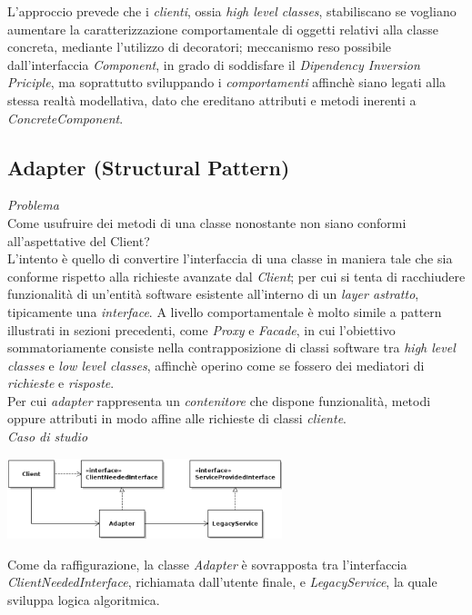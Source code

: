 \documentclass{article}
\begin{document}
L'approccio prevede che i \textit{clienti}, ossia \textit{high level classes}, stabiliscano se vogliano aumentare la caratterizzazione comportamentale di oggetti relativi alla classe concreta, mediante l'utilizzo di decoratori; meccanismo reso possibile  dall'interfaccia \textit{Component}, in grado di soddisfare il \textit{Dipendency Inversion Priciple}, ma soprattutto sviluppando i \textit{comportamenti} affinchè siano legati alla stessa realtà modellativa, dato che ereditano attributi e metodi inerenti a \textit{ConcreteComponent}.

\subsection*{Adapter (Structural Pattern)}
\large
\textit{Problema}\\
Come usufruire dei metodi di una classe nonostante non siano conformi all'aspettative del Client?\vspace*{14pt}\\
L'intento è quello di convertire l'interfaccia di una classe in maniera tale che sia conforme rispetto alla richieste avanzate dal \textit{Client}; per cui si tenta di racchiudere funzionalità di un'entità software esistente all'interno di un \textit{layer astratto}, tipicamente una \textit{interface}. A livello comportamentale è molto simile a pattern illustrati in sezioni precedenti, come \textit{Proxy} e \textit{Facade}, in cui l'obiettivo sommatoriamente consiste nella contrapposizione di classi software tra \textit{high level classes} e \textit{low level classes}, affinchè operino come se fossero dei mediatori di \textit{richieste} e \textit{risposte}.\vspace*{7pt}\\
Per cui \textit{adapter} rappresenta un \textit{contenitore} che dispone funzionalità, metodi oppure attributi in modo affine alle richieste di classi \textit{cliente}.\vspace*{14pt}\\
\textit{Caso di studio}\\
\begin{center}
    \includegraphics[width=0.6\textwidth]{foto 6.png}
\end{center}
Come da raffigurazione, la classe \textit{Adapter} è sovrapposta tra l'interfaccia \textit{ClientNeededInterface}, richiamata dall'utente finale, e \textit{LegacyService}, la quale sviluppa logica algoritmica. 
\end{document}
